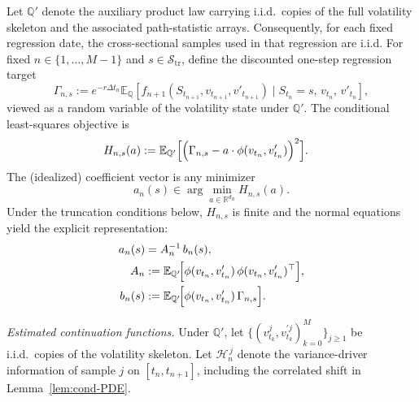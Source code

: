 \documentclass[pdflatex,sn-mathphys-num]{sn-jnl}
\theoremstyle{thmstyleone}%
\theoremstyle{thmstylethree}%
\theoremstyle{thmstyletwo}%
\begin{document}
Let $\mathbb{Q}'$ denote the auxiliary product law carrying i.i.d.\ copies of the full volatility skeleton and
the associated path-statistic arrays. Consequently, for each fixed regression date, the cross-sectional samples
used in that regression are i.i.d. For fixed $n\in\{1,\dots,M-1\}$ and
$s\in\mathcal S_{\mathrm{tr}}$, define the discounted one-step regression target
\[
\Gamma_{n,s}
:=e^{-r\Delta t_n}
\mathbb{E}_{\mathbb{Q}}\!\left[
f_{n+1}(S_{t_{n+1}},v_{t_{n+1}},v'_{t_{n+1}})
\mid S_{t_n}=s,\,v_{t_n},\,v'_{t_n}
\right],
\]
viewed as a random variable of the volatility state under $\mathbb{Q}'$. The conditional least-squares objective is
\begin{equation}
\begin{aligned}
H_{n,s}(a)
&:=
\mathbb{E}_{\mathbb{Q}'}
\Bigl[
\Bigl(
\Gamma_{n,s}
- a\cdot \phi(v_{t_n},v'_{t_n})
\Bigr)^2
\Bigr].
\end{aligned}
\label{eq:Hns}
\end{equation}
The (idealized) coefficient vector is any minimizer
\[
a_n(s)\in \arg\min_{a\in\mathbb{R}^{d_B}} H_{n,s}(a).
\]
Under the truncation conditions below, $H_{n,s}$ is finite and the normal equations yield the explicit
representation:
\begin{equation}
\begin{aligned}
a_n(s)&=A_n^{-1}\, b_n(s),\\
A_n&:= \mathbb{E}_{\mathbb{Q}'}\!\Bigl[
\phi(v_{t_n},v'_{t_n})\,\phi(v_{t_n},v'_{t_n})^\top
\Bigr],\\
b_n(s)&:= \mathbb{E}_{\mathbb{Q}'}\!\Bigl[
\phi(v_{t_n},v'_{t_n})\,
\Gamma_{n,s}
\Bigr].
\end{aligned}
\label{eq:ideal_coeff_normal_eq}
\end{equation}

\noindent\emph{Estimated continuation functions.}
Under $\mathbb{Q}'$, let
$\{(v^j_{t_k},v^{\prime j}_{t_k})_{k=0}^M\}_{j\ge 1}$ be i.i.d.\ copies of the volatility skeleton. Let
$\mathcal H_n^{\,j}$ denote the variance-driver information of sample $j$ on $[t_n,t_{n+1}]$, including the
correlated shift in Lemma~\ref{lem:cond-PDE}.
\end{document}
